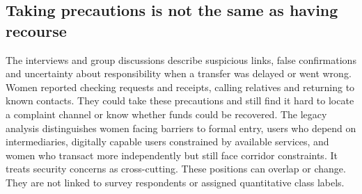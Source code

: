 \subsection{Taking precautions is not the same as having recourse}

The interviews and group discussions describe suspicious links, false confirmations and uncertainty about responsibility when a transfer was delayed or went wrong. Women reported checking requests and receipts, calling relatives and returning to known contacts. They could take these precautions and still find it hard to locate a complaint channel or know whether funds could be recovered. The legacy analysis distinguishes women facing barriers to formal entry, users who depend on intermediaries, digitally capable users constrained by available services, and women who transact more independently but still face corridor constraints. It treats security concerns as cross-cutting. These positions can overlap or change. They are not linked to survey respondents or assigned quantitative class labels.
